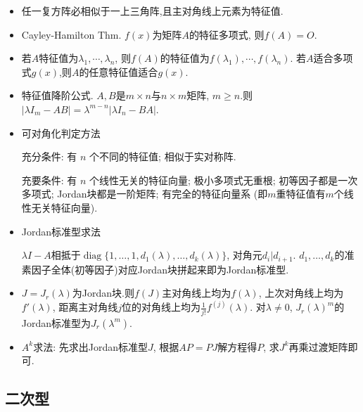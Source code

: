 \documentclass[UTF8]{ctexart}
\begin{document}
\begin{itemize}

	\item 任一复方阵必相似于一上三角阵,且主对角线上元素为特征值.

	\item Cayley-Hamilton Thm. $f(x)$为矩阵$A$的特征多项式, 则$f(A)=O$.

	\item 若$A$特征值为$\lambda_1,\cdots,\lambda_n$, 则$f(A)$的特征值为$f(\lambda_1),\cdots,f(\lambda_n)$.
	      若$A$适合多项式$g(x)$,则$A$的任意特征值适合$g(x)$.

	\item 特征值降阶公式.
	      $A, B$是$m \times n$与$n \times m$矩阵, $m \geq n$.则
	      $\left|\lambda I_{m}-A B\right|=\lambda^{m-n}\left|\lambda I_{n}-B A\right|$.

	\item 可对角化判定方法\par
	      充分条件: 有 $n$ 个不同的特征值; 相似于实对称阵.\par
	      充要条件: 有 $n$ 个线性无关的特征向量; 极小多项式无重根;
	      初等因子都是一次多项式; Jordan块都是一阶矩阵;
	      有完全的特征向量系 (即$m$重特征值有$m$个线性无关特征向量).

	\item Jordan标准型求法\par
	      $\lambda I-A$相抵于$\operatorname{diag}\{1,\dots,1,d_1(\lambda),\dots,d_k(\lambda)\}$, 对角元$d_i | d_{i+1}$.
	      $d_1,\dots,d_k$的准素因子全体(初等因子)对应Jordan块拼起来即为Jordan标准型.

	\item $J=J_r(\lambda )$为Jordan块.则$f(J)$主对角线上均为$f(\lambda )$, 上次对角线上均为$f'(\lambda)$,
	      距离主对角线$j$位的对角线上均为$\frac{1}{j!}f^{(j)}(\lambda)$.
	      对$\lambda\neq 0$, $J_r(\lambda)^m$的Jordan标准型为$J_r(\lambda^m)$.

	\item $A^k$求法: 先求出Jordan标准型$J$, 根据$AP=PJ$解方程得$P$, 求$J^k$再乘过渡矩阵即可.

\end{itemize}


\subsection{二次型}
\end{document}
